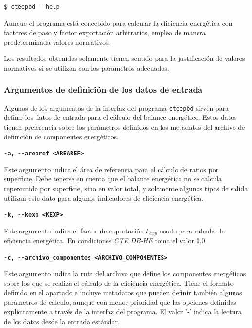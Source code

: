 \documentclass[10pt,notitlepage,oneside,a4paper]{article}
\begin{document}
\begin{Verbatim}[fontsize=\small]
	$ cteepbd --help
\end{Verbatim}


\begin{myquote}\footnotesize
Aunque el programa está concebido para calcular la eficiencia energética con factores de paso y factor exportación arbitrarios, emplea de manera predeterminada valores normativos.

Los resultados obtenidos solamente tienen sentido para la justificación de valores normativos si se utilizan con los parámetros adecuados.
\end{myquote}

\subsubsection{Argumentos de definición de los datos de entrada}

Algunos de los argumentos de la interfaz del programa \texttt{cteepbd} sirven para definir los datos de entrada para el cálculo del balance energético. Estos datos tienen preferencia sobre los parámetros definidos en los metadatos del archivo de definición de componentes energéticos.

\textbf{\texttt{-a, -{}-arearef <AREAREF>}}

Este argumento indica el área de referencia para el cálculo de ratios por superficie. Debe tenerse en cuenta que el balance energético no se calcula repercutido por superficie, sino en valor total, y solamente algunos tipos de salida utilizan este dato para algunos indicadores de eficiencia energética.

\textbf{\texttt{-k, -{}-kexp <KEXP>}}

Este argumento indica el factor de exportación $k_{exp}$ usado para calcular la eficiencia energética. En condiciones \textit{CTE DB-HE} toma el valor $0.0$.

\textbf{\texttt{-c, -{}-archivo\_componentes <ARCHIVO\_COMPONENTES>}}

Este argumento indica la ruta del archivo que define los componentes energéticos sobre los que se realiza el cálculo de la eficiencia energética. Tiene el formato definido en el apartado  e incluye metadatos que pueden definir también algunos parámetros de cálculo, aunque con menor prioridad que las opciones definidas explícitamente a través de la interfaz del programa. El valor '-' indica la lectura de los datos desde la entrada estándar.
\end{document}
